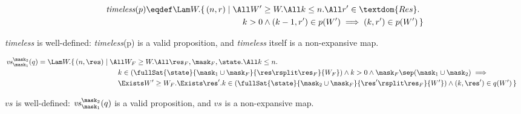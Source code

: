 
\begin{align*}
	\textit{timeless}(p) \eqdef 
	\begin{aligned}[t]
		\Lam W.
		\{\, (n, r) &\mid \All W' \geq W. \All k \leq n. \All r' \in \textdom{Res}. \\
		&\qquad
		k > 0 \land (k - 1, r') \in p(W') \implies (k, r') \in p(W') \,\}
	\end{aligned}
\end{align*}

\begin{lem}
	\textit{timeless} is well-defined: \textit{timeless}(p) is a valid proposition, and \textit{timeless} itself is a non-expansive map.
\end{lem}


\begin{align*}
	\mathit{vs}_{\mask_1}^{\mask_2}(q) &= \Lam W.
	\begin{aligned}[t]
		\{\, (n, \res) &\mid \All W_F \geq W. \All \res_F, \mask_F, \state. \All k \leq n.\\
		&\qquad 
		k \in (\fullSat{\state}{\mask_1 \cup \mask_F}{\res \rsplit \res_F}{W_F}) \land k > 0 \land \mask_F \sep (\mask_1 \cup \mask_2) \implies{} \\
		&\qquad
		\Exists W' \geq W_F. \Exists \res'. k \in (\fullSat{\state}{\mask_2 \cup \mask_F}{\res' \rsplit \res_F}{W'}) \land (k, \res') \in q(W')
		\,\}
	\end{aligned}
\end{align*}
\begin{lem}
	$\mathit{vs}$ is well-defined: $\mathit{vs}_{\mask_1}^{\mask_2}(q)$ is a valid proposition, and $\mathit{vs}$ is a non-expansive map.
\end{lem}



